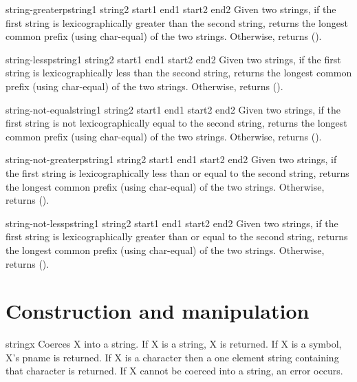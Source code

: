 \documentclass[10pt,english]{book}
\begin{document}
\begin{function}{string-greaterp}{string1 string2 \key start1 end1 start2 end2}
  Given two strings, if the first string is lexicographically greater than
  the second string, returns the longest common prefix (using char-equal)
  of the two strings. Otherwise, returns ().
\end{function}

\begin{function}{string-lessp}{string1 string2 \key start1 end1 start2 end2}
  Given two strings, if the first string is lexicographically less than
  the second string, returns the longest common prefix (using char-equal)
  of the two strings. Otherwise, returns ().
\end{function}

\begin{function}{string-not-equal}{string1 string2 \key start1 end1 start2 end2}
  Given two strings, if the first string is not lexicographically equal
  to the second string, returns the longest common prefix (using char-equal)
  of the two strings. Otherwise, returns ().
\end{function}

\begin{function}{string-not-greaterp}{string1 string2 \key start1 end1 start2 end2}
  Given two strings, if the first string is lexicographically less than
  or equal to the second string, returns the longest common prefix
  (using char-equal) of the two strings. Otherwise, returns ().
\end{function}

\begin{function}{string-not-lessp}{string1 string2 \key start1 end1 start2 end2}
  Given two strings, if the first string is lexicographically greater
  than or equal to the second string, returns the longest common prefix
  (using char-equal) of the two strings. Otherwise, returns ().
\end{function}

\section{Construction and manipulation}
\label{sec:constr-manip}

\begin{function}{string}{x}
  Coerces X into a string. If X is a string, X is returned. If X is a
   symbol, X's pname is returned. If X is a character then a one element
   string containing that character is returned. If X cannot be coerced
   into a string, an error occurs.
\end{function}
\end{document}
